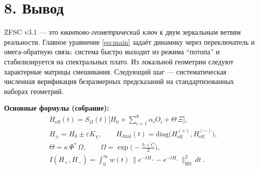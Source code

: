 \documentclass[a4paper,12pt]{article}
\begin{document}
\section*{8. Вывод}
ZFSC v3.1 --- это \emph{квантово-геометрический ключ} к двум зеркальным ветвям реальности.
Главное уравнение \eqref{eq:main} задаёт динамику через переключатель и омега-обратную связь: система быстро выходит из режима ``потопа'' и стабилизируется на спектральных плато.
Из локальной геометрии следуют характерные матрицы смешивания.
Следующий шаг --- систематическая численная верификация безразмерных предсказаний на стандартизованных наборах геометрий.

\bigskip
\noindent\textbf{Основные формулы (собрание):}
\begin{align*}
& H_{\mathrm{eff}}(t)=S_\Omega(t)\Big[H_0+\sum_{i=1}^{8}\alpha_i O_i+\Theta\,\Xi\Big], \\[0.3em]
& H_\pm = H_0 \pm \varepsilon K_\chi,\qquad
H_{\mathrm{dual}}(t)=\mathrm{diag}\!\big(H_{\mathrm{eff}}^{(+)},H_{\mathrm{eff}}^{(-)}\big), \\[0.3em]
& \Theta=\kappa\,\Phi^\ast\,\Omega,\qquad
\Omega=\exp\!\Big(-\frac{h+C}{2}\Big), \\[0.3em]
& I(H_+,H_-)=\int_0^\infty w(t)\,\big\|e^{-tH_+}-e^{-tH_-}\big\|_{\mathrm{HS}}^2\,dt\;.
\end{align*}
\end{document}

